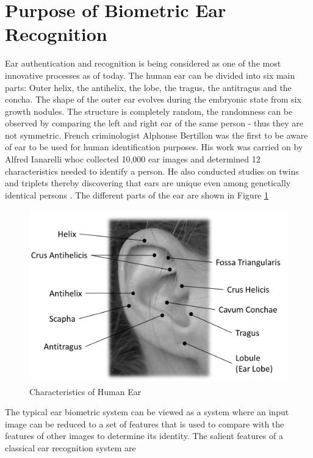 \section{Purpose of Biometric Ear Recognition} 

Ear authentication and recognition is being considered as one of the most innovative processes as of today. The human ear can be divided into six main parts: Outer helix,
the antihelix, the lobe, the tragus, the antitragus and the concha. The shape of the outer ear evolves during the embryonic state from six growth nodules. The structure is completely random, the randomness can be observed by comparing the left and right ear of the same person - thus they are not symmetric. French criminologist Alphonse Bertillon was the first to be aware of ear to be used for human identification purposes. His work was carried on by Alfred Ianarelli whoc collected 10,000 ear images and determined 12 characteristics needed to identify a person. He also conducted studies on twins and triplets thereby discovering that ears are unique even among genetically identical persons \cite{pflug2012ear}. The different parts of the ear are shown in Figure \ref{fig:Figure2}

\begin{figure}[t]
	\includegraphics[width=\textwidth]{Figures/Figure2}
	\caption{Characteristics of Human Ear\cite{pflug2012ear}} 
	\label{fig:Figure2}
\end{figure}
The typical ear biometric system can be viewed as a system where an input image can be reduced to a set of features that is used to compare with the features of other images to determine its identity. The salient features of a classical ear recognition system are\cite{abaza} 

